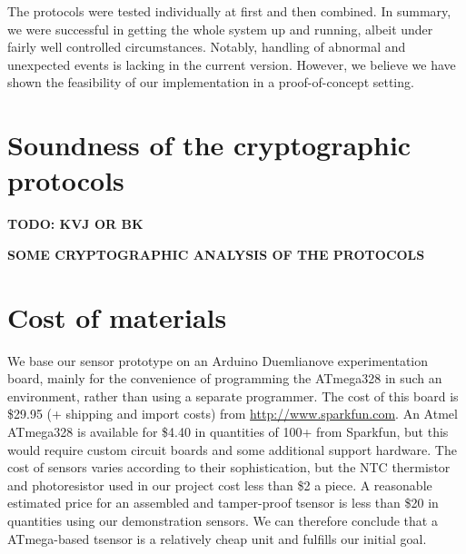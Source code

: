 The protocols were tested individually at first and then combined. In summary, we were successful in getting the whole system up and running, albeit under fairly well controlled circumstances. Notably, handling of abnormal and unexpected events is lacking in the current version. However, we believe we have shown the feasibility of our implementation in a proof-of-concept setting.

\section{Soundness of the cryptographic protocols}

\textbf{TODO: KVJ OR BK}

\textbf{SOME CRYPTOGRAPHIC ANALYSIS OF THE PROTOCOLS}

\section{Cost of materials}

We base our sensor prototype on an Arduino Duemlianove experimentation board, mainly for the convenience of programming the ATmega328 in such an environment, rather than using a separate programmer. The cost of this board is \$29.95 (+ shipping and import costs) from \url{http://www.sparkfun.com}. An Atmel ATmega328 is available for \$4.40 in quantities of 100+ from Sparkfun, but this would require custom circuit boards and some additional support hardware. The cost of sensors varies according to their sophistication, but the NTC thermistor and photoresistor used in our project cost less than \$2 a piece. A reasonable estimated price for an assembled and tamper-proof tsensor is less than \$20 in quantities using our demonstration sensors. We can therefore conclude that a ATmega-based tsensor is a relatively cheap unit and fulfills our initial goal.

